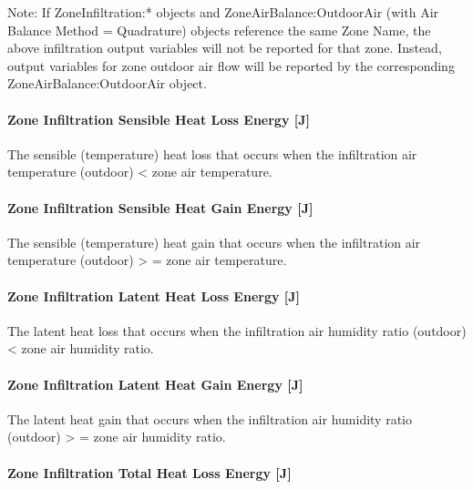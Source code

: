 Note: If ZoneInfiltration:* objects and ZoneAirBalance:OutdoorAir (with Air Balance Method = Quadrature) objects reference the same Zone Name, the above infiltration output variables will not be reported for that zone. Instead, output variables for zone outdoor air flow will be reported by the corresponding ZoneAirBalance:OutdoorAir object.

\paragraph{Zone Infiltration Sensible Heat Loss Energy {[}J{]}}\label{zone-infiltration-sensible-heat-loss-energy-j}

The sensible (temperature) heat loss that occurs when the infiltration air temperature (outdoor) \textless{} zone air temperature.

\paragraph{Zone Infiltration Sensible Heat Gain Energy {[}J{]}}\label{zone-infiltration-sensible-heat-gain-energy-j}

The sensible (temperature) heat gain that occurs when the infiltration air temperature (outdoor) \textgreater{} = zone air temperature.

\paragraph{Zone Infiltration Latent Heat Loss Energy {[}J{]}}\label{zone-infiltration-latent-heat-loss-energy-j}

The latent heat loss that occurs when the infiltration air humidity ratio (outdoor) \textless{} zone air humidity ratio.

\paragraph{Zone Infiltration Latent Heat Gain Energy {[}J{]}}\label{zone-infiltration-latent-heat-gain-energy-j}

The latent heat gain that occurs when the infiltration air humidity ratio (outdoor) \textgreater{} = zone air humidity ratio.

\paragraph{Zone Infiltration Total Heat Loss Energy {[}J{]}}\label{zone-infiltration-total-heat-loss-energy-j}

